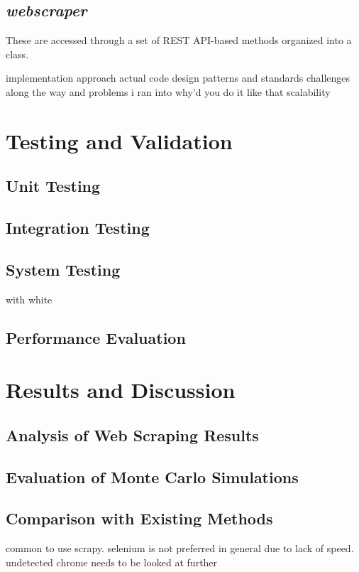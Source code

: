 \documentclass{thesis-ekf}
\theoremstyle{definition}
\theoremstyle{remark}
\begin{document}
\section{\emph{webscraper}} \label{sec-webscraper}

These are accessed through a set of REST API-based methods organized into a class. 


implementation approach
actual code
design patterns and standards
challenges along the way and problems i ran into
why'd you do it like that
scalability


\chapter{Testing and Validation} \label{ch-testing}

\section{Unit Testing}
\section{Integration Testing}
\section{System Testing}
with white
\section{Performance Evaluation}

\chapter{Results and Discussion}
\section{Analysis of Web Scraping Results}
\section{Evaluation of Monte Carlo Simulations}
\section{Comparison with Existing Methods}
common to use scrapy. selenium is not preferred in general due to lack of speed. undetected chrome needs to be looked at further
\end{document}
